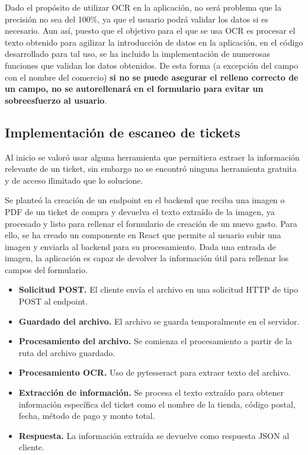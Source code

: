 Dado el propósito de utilizar OCR en la aplicación, no será problema que la precisión no sea del 100\%, ya que el usuario podrá validar los datos si es necesario. Aun así, puesto que el objetivo para el que se usa OCR es procesar el texto obtenido para agilizar la introducción de datos en la aplicación, en el código desarrollado para tal uso, se ha incluido la implementación de numerosas funciones que validan los datos obtenidos. De esta forma (a excepción del campo con el nombre del comercio) \textbf{si no se puede asegurar el relleno correcto de un campo, no se autorellenará en el formulario para evitar un sobreesfuerzo al usuario}.



\subsection{Implementación de escaneo de tickets}
Al inicio se valoró usar alguna herramienta que permitiera extraer la información relevante de un ticket, sin embargo no se encontró ninguna herramienta gratuita y de acceso ilimitado que lo solucione. 

Se planteó la creación de un endpoint en el backend que reciba una imagen o PDF de un ticket de compra y devuelva el texto extraído de la imagen, ya procesado y listo para rellenar el formulario de creación de un nuevo gasto. Para ello, se ha creado un componente en React que permite al usuario subir una imagen y enviarla al backend para su procesamiento. Dada una entrada de imagen, la aplicación es capaz de devolver la información útil para rellenar los campos del formulario.

\begin{itemize}
    \item \textbf{Solicitud POST.} El cliente envía el archivo en una solicitud HTTP de tipo POST al endpoint.
    \item \textbf{Guardado del archivo.} El archivo se guarda temporalmente en el servidor.
    \item \textbf{Procesamiento del archivo.} Se comienza el procesamiento a partir de la ruta del archivo guardado.
    \item \textbf{Procesamiento OCR.} Uso de pytesseract para extraer texto del archivo.
    \item \textbf{Extracción de información.} Se procesa el texto extraído para obtener información específica del ticket como el nombre de la tienda, código postal, fecha, método de pago y monto total.
    \item \textbf{Respuesta.} La información extraída se devuelve como respuesta JSON al cliente.
\end{itemize}

